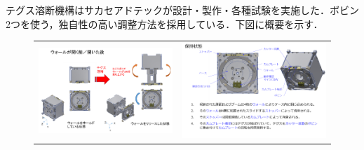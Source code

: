 テグス溶断機構はサカセアドテックが設計・製作・各種試験を実施した．ボビン2つを使う，独自性の高い調整方法を採用している．下図に概要を示す．
\begin{figure}[H]
	\centering
		\centering
	\begin{tabular}{cc}
		\begin{minipage}{0.5\hsize}
			\begin{center}
				\includegraphics[width=1\textwidth]{03/fig/3-9-3-1-18.png}
			\end{center}
		\end{minipage}&
		\begin{minipage}{0.5\hsize}
			\begin{center}
				\includegraphics[width=1\textwidth]{03/fig/3-9-3-1-19.png}
			\end{center}
		\end{minipage}
	\end{tabular}
		\begin{tabular}{cc}

\end{tabular}
\end{figure}
